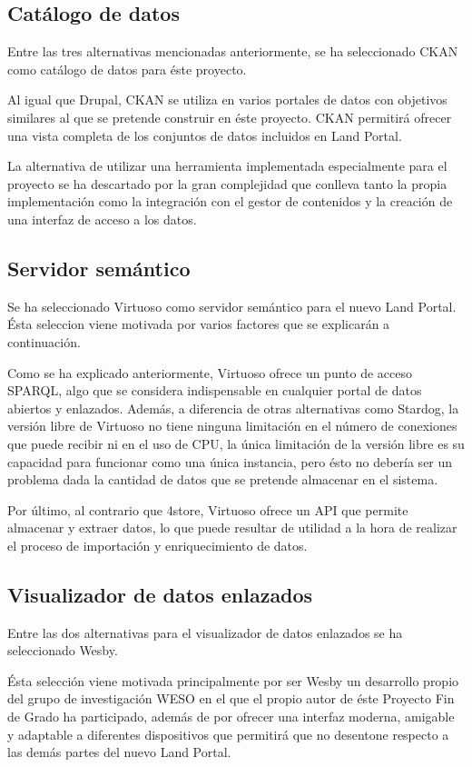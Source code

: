 \subsection{Catálogo de datos}
Entre las tres alternativas mencionadas anteriormente, se ha seleccionado CKAN como catálogo de datos para éste proyecto.

Al igual que Drupal, CKAN se utiliza en varios portales de datos con objetivos similares al que se pretende construir en éste proyecto. CKAN permitirá ofrecer una vista completa de los conjuntos de datos incluidos en Land Portal.

La alternativa de utilizar una herramienta implementada especialmente para el proyecto se ha descartado por la gran complejidad que conlleva tanto la propia implementación como la integración con el gestor de contenidos y la creación de una interfaz de acceso a los datos.


\subsection{Servidor semántico}
Se ha seleccionado Virtuoso como servidor semántico para el nuevo Land Portal. Ésta seleccion viene motivada por varios factores que se explicarán a continuación.

Como se ha explicado anteriormente, Virtuoso ofrece un punto de acceso SPARQL, algo que se considera indispensable en cualquier portal de datos abiertos y enlazados.  Además, a diferencia de otras alternativas como Stardog, la versión libre de Virtuoso no tiene ninguna limitación en el número de conexiones que puede recibir ni en el uso de CPU, la única limitación de la versión libre es su capacidad para funcionar como una única instancia, pero ésto no debería ser un problema dada la cantidad de datos que se pretende almacenar en el sistema.

Por último, al contrario que 4store, Virtuoso ofrece un API que permite almacenar y extraer datos, lo que puede resultar de utilidad a la hora de realizar el proceso de importación y enriquecimiento de datos.


\subsection{Visualizador de datos enlazados}
Entre las dos alternativas para el visualizador de datos enlazados se ha seleccionado Wesby.

Ésta selección viene motivada principalmente por ser Wesby un desarrollo propio del grupo de investigación WESO en el que el propio autor de éste Proyecto Fin de Grado ha participado, además de por ofrecer una interfaz moderna, amigable y adaptable a diferentes dispositivos que permitirá que no desentone respecto a las demás partes del nuevo Land Portal.


